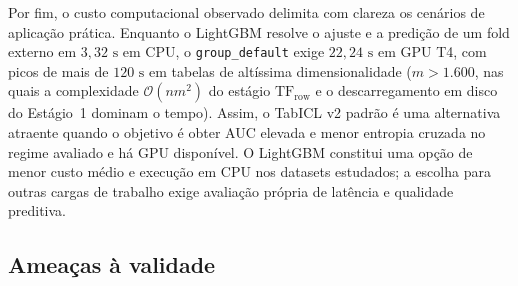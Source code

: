 \documentclass[11pt,a4paper]{article}
\begin{document}
Por fim, o custo computacional observado delimita com clareza os cenários de aplicação prática. Enquanto o LightGBM resolve o ajuste e a predição de um fold externo em $3{,}32\text{ s}$ em CPU, o \texttt{group\_default} exige $22{,}24\text{ s}$ em GPU T4, com picos de mais de $120\text{ s}$ em tabelas de altíssima dimensionalidade ($m > 1.600$, nas quais a complexidade $\mathcal{O}(n m^2)$ do estágio $\mathrm{TF}_{\mathrm{row}}$ e o descarregamento em disco do Estágio~1 dominam o tempo). Assim, o TabICL v2 padrão é uma alternativa atraente quando o objetivo é obter AUC elevada e menor entropia cruzada no regime avaliado e há GPU disponível. O LightGBM constitui uma opção de menor custo médio e execução em CPU nos datasets estudados; a escolha para outras cargas de trabalho exige avaliação própria de latência e qualidade preditiva.

\subsection{Ameaças à validade}
\label{sec:ameacas}
\end{document}
